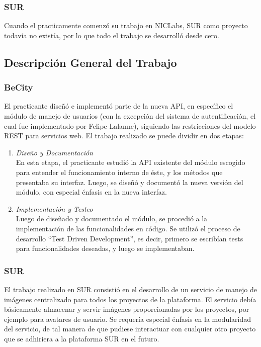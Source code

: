 \documentclass[11pt,letterpaper]{article}
\begin{document}
\subsubsection{SUR}

Cuando el practicamente comenzó su trabajo en NICLabs, SUR como proyecto todavía no existía, por lo que todo el trabajo se desarrolló desde cero.
\pagebreak
\subsection{Descripción General del Trabajo}

\subsubsection{BeCity}

El practicante diseñó e implementó parte de la nueva API, en específico el módulo de manejo de usuarios (con la excepción del sistema de autentificación, el cual fue implementado por Felipe Lalanne), siguiendo las restricciones del modelo REST para servicios web. El trabajo realizado se puede dividir en dos etapas:
\begin{enumerate}
    \item \emph{Diseño y Documentación} \\ En esta etapa, el practicante estudió la API existente del módulo escogido para entender el funcionamiento interno de éste, y los métodos que presentaba su interfaz. Luego, se diseñó y documentó la nueva versión del módulo, con especial énfasis en la nueva interfaz.
    \item \emph{Implementación y Testeo} \\ Luego de diseñado y documentado el módulo, se procedió a la implementación de las funcionalidades en código. Se utilizó el proceso de desarrollo ``Test Driven Development'', es decir, primero se escribían tests para funcionalidades deseadas, y luego se implementaban.
\end{enumerate}

\subsubsection{SUR}

El trabajo realizado en SUR consistió en el desarrollo de un servicio de manejo de imágenes centralizado para todos los proyectos de la plataforma. El servicio debía básicamente almacenar y servir imágenes proporcionadas por los proyectos, por ejemplo para avatares de usuario. Se requería especial énfasis en la modularidad del servicio, de tal manera de que pudiese interactuar con cualquier otro proyecto que se adhiriera a la plataforma SUR en el futuro.
\end{document}
